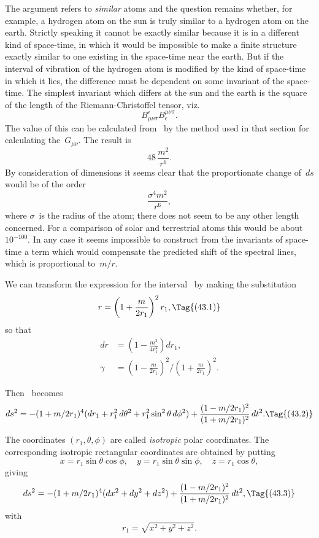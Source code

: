 \documentclass[12pt]{book}
\begin{document}
The argument refers to \emph{similar} atoms and the question remains whether,
for example, a hydrogen atom on the sun is truly similar to a hydrogen atom
on the earth. Strictly speaking it cannot be exactly similar because it is in a
different kind of space-time, in which it would be impossible to make a finite
structure exactly similar to one existing in the space-time near the earth. But
if the interval of vibration of the hydrogen atom is modified by the kind of
space-time in which it lies, the difference must be dependent on some invariant
of the space-time. The simplest invariant which differs at the sun and the
earth is the square of the length of the Riemann-Christoffel tensor, viz.\
\[
B_{\mu\nu\sigma}^{\epsilon} B_{\epsilon}^{\mu\nu\sigma}.
\]
The value of this can be calculated from~ by the method used in that
section for calculating the~$G_{\mu\nu}$. The result is
\[
48\, \frac{m^{2}}{r^{6}}.
\]
By consideration of dimensions it seems clear that the proportionate change
of~$ds$ would be of the order
\[
\frac{\sigma^{4} m^{2}}{r^{6}},
\]
where $\sigma$~is the radius of the atom; there does not seem to be any other length
concerned. For a comparison of solar and terrestrial atoms this would be about
$10^{-100}$. In any case it seems impossible to construct from the invariants of
space-time a term which would compensate the predicted shift of the spectral
lines, which is proportional to~$m/r$.

%
%

We can transform the expression for the interval~ by making the
substitution
\[
r = \left(1 + \frac{m}{2r_{1}}\right)^{2} r_{1},
\Tag{(43.1)}
\]
so that
\begin{align*}
dr &= \left(1 - \frac{m^{2}}{4r_{1}^{2}}\right) dr_{1}, \\
\gamma &= \left(1 - \frac{m}{2r_{1}}\right)^{2}\bigg/\left(1 + \frac{m}{2r_{1}}\right)^{2}.
\end{align*}

Then ~becomes
\[
  ds^{2} = -(1 + m/2r_{1})^{4} (dr_{1} + r_{1}^{2}\, d\theta^{2} + r_{1}^{2}\sin^{2}\theta\, d\phi^{2})
  + \frac{(1 - m/2r_{1})^{2}}{(1 + m/2r_{1})^{2}}\, dt^{2}.
  \Tag{(43.2)}
\]

The coordinates $(r_{1},\theta, \phi)$ are called \emph{isotropic} polar coordinates. The corresponding
isotropic rectangular coordinates are obtained by putting
\[
x = r_{1} \sin\theta \cos\phi,\quad
y = r_{1} \sin\theta \sin\phi,\quad
z = r_{1} \cos\theta,
\]
giving
\[
ds^{2} = -(1 + m/2r_{1})^{4} (dx^{2} + dy^{2} + dz^{2})
+ \frac{(1 - m/2r_{1})^{2}}{(1 + m/2r_{1})^{2}}\, dt^{2},
\Tag{(43.3)}
\]
with
\[
r_{1} = \sqrt{x^{2} + y^{2} + z^{2}}.
\]
\end{document}
